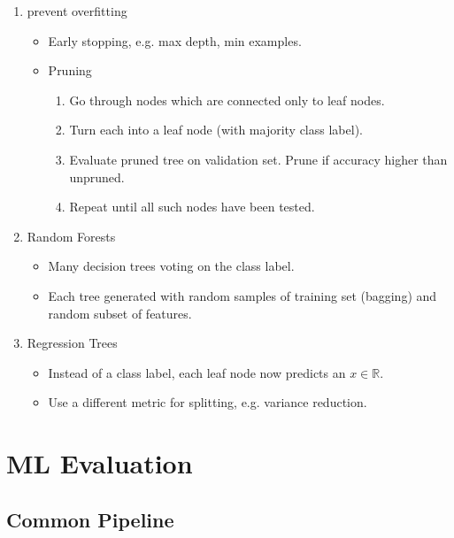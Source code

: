 \documentclass[twocolumn,landscape,10pt]{article}
\theoremstyle{definition}
\begin{document}
\begin{enumerate}
    \item prevent overfitting
        \begin{itemize}
            \item Early stopping, e.g. max depth, min examples.
            \item Pruning
                \begin{enumerate}[label = (\roman*)]
                    \item Go through nodes which are connected only to leaf
                        nodes.
                    \item Turn each into a leaf node (with majority class
                        label).
                    \item Evaluate pruned tree on validation set. Prune if
                        accuracy higher than unpruned.
                    \item Repeat until all such nodes have been tested.
                \end{enumerate} 
        \end{itemize} 
    \item Random Forests
        \begin{itemize}
            \item Many decision trees voting on the class label.
            \item Each tree generated with random samples of training set
                (bagging) and random subset of features.
        \end{itemize} 
    \item Regression Trees
        \begin{itemize}
            \item Instead of a class label, each leaf node now predicts an
                $x\in\mathbb{R}$.
            \item Use a different metric for splitting, e.g. variance reduction.
        \end{itemize} 
\end{enumerate} 

\section{ML Evaluation}

\subsection{Common Pipeline}
\end{document}
